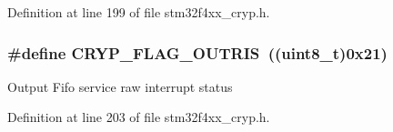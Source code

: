 Definition at line 199 of file stm32f4xx\-\_\-cryp.\-h.

\hypertarget{group___c_r_y_p__flags__definition_gae6f06dee9a989cfc664be879fed2ded2}{
\subsubsection[{C\-R\-Y\-P\-\_\-\-F\-L\-A\-G\-\_\-\-O\-U\-T\-R\-I\-S}]{\setlength{\rightskip}{0pt plus 5cm}\#define C\-R\-Y\-P\-\_\-\-F\-L\-A\-G\-\_\-\-O\-U\-T\-R\-I\-S~((uint8\-\_\-t)0x21)}}\label{group___c_r_y_p__flags__definition_gae6f06dee9a989cfc664be879fed2ded2}
Output Fifo service raw interrupt status 

Definition at line 203 of file stm32f4xx\-\_\-cryp.\-h.

